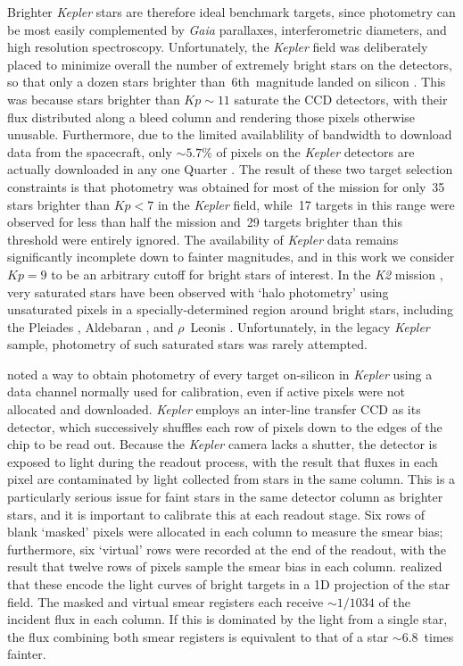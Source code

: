 \documentclass[a4paper,fleqn,usenatbib]{mnras}
\newcommand{\kepler}{\emph{Kepler}\xspace}
\newcommand{\ktwo}{\emph{K2}\xspace}
\newcommand{\gaia}{\emph{Gaia}\xspace}
\begin{document}
Brighter \kepler stars are therefore ideal benchmark targets, since photometry can be most easily complemented by \gaia parallaxes, interferometric diameters, and high resolution spectroscopy.  
Unfortunately, the \kepler field was deliberately placed to minimize overall the number of extremely bright stars on the detectors, so that only a dozen stars brighter than~6th~magnitude landed on silicon \citep{2010ApJ...713L..79K}. This was because stars brighter than $Kp \sim 11$ saturate the CCD detectors, with their flux distributed along a bleed column and rendering those pixels otherwise unusable. Furthermore, due to the limited availablility of bandwidth to download data from the spacecraft, only $\sim 5.7\%$ of pixels on the \kepler detectors are actually downloaded in any one Quarter \citep{2010ApJ...713L..87J}. The result of these two target selection constraints is that photometry was obtained for most of the mission for only~35 stars brighter than $Kp<7$ in the \kepler field, while~17 targets in this range were observed for less than half the mission and~29 targets brighter than this threshold were entirely ignored. The availability of \kepler data remains significantly incomplete down to fainter magnitudes, and in this work we consider $Kp=9$ to be an arbitrary cutoff for bright stars of interest. In the \ktwo mission \citep{k2early}, very saturated stars have been observed with `halo photometry' using unsaturated pixels in a specially-determined region around bright stars, including the Pleiades \citep{halo}, Aldebaran \citep{aldebaran}, and $\rho$~Leonis \citep{rholeo}. Unfortunately, in the legacy \kepler sample, photometry of such saturated stars was rarely attempted.

\citet{orig_smear} noted a way to obtain photometry of every target on-silicon in \kepler using a data channel normally used for calibration, even if active pixels were not allocated and downloaded. \kepler employs an inter-line transfer CCD as its detector, which successively shuffles each row of pixels down to the edges of the chip to be read out. Because the \kepler camera lacks a shutter, the detector is exposed to light during the readout process, with the result that fluxes in each pixel are contaminated by light collected from stars in the same column. This is a particularly serious issue for faint stars in the same detector column as brighter stars, and it is important to calibrate this at each readout stage. Six rows of blank `masked' pixels were allocated in each column to measure the smear bias; furthermore, six `virtual' rows were recorded at the end of the readout, with the result that twelve rows of pixels sample the smear bias in each column. \citet{orig_smear} realized that these encode the light curves of bright targets in a 1D projection of the star field. The masked and virtual smear registers each receive $\sim 1/1034$ of the incident flux in each column. If this is dominated by the light from a single star, the flux combining both smear registers is equivalent to that of a star $\sim 6.8$~times fainter. 
\end{document}
